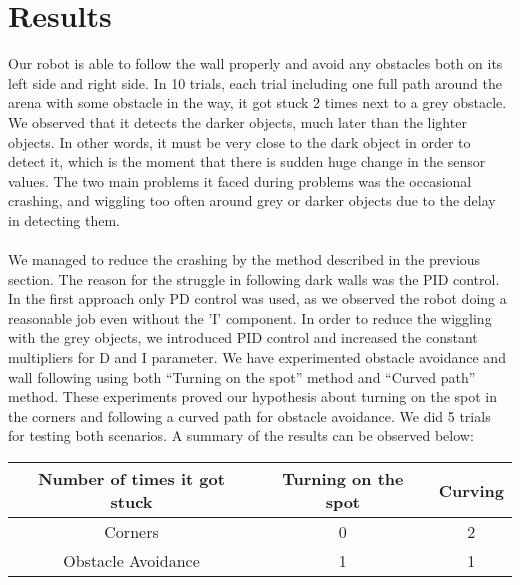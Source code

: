 \documentclass[]{article}
\begin{document}
\section{Results}
Our robot is able to follow the wall properly and avoid any obstacles both on its left side and right side. In 10 trials, each trial including one full path around the arena with some obstacle in the way, it got stuck 2 times next to a grey obstacle. We observed that it detects the darker objects, much later than the lighter objects. In other words, it must be very close to the dark object in order to detect it, which is the moment that there is sudden huge change in the sensor values. The two main problems it faced during problems was the occasional crashing, and wiggling too often around grey or darker objects due to the delay in detecting them.\\\\
We managed to reduce the crashing by the method described in the previous section. The reason for the struggle in following dark walls was the PID control. In the first approach only PD control was used, as we observed the robot doing a reasonable job even without the 'I' component. In order to reduce the wiggling with the grey objects, we introduced PID control and increased the constant multipliers for D and I parameter. We have experimented obstacle avoidance and wall following using both “Turning on the spot” method and “Curved path” method. These experiments proved our hypothesis about turning on the spot in the corners and following a curved path for obstacle avoidance. We did 5 trials for testing both scenarios. A summary of the results can be observed below:\\
\begin{center}
\begin{tabular}{ |c|c|c| }
 \hline
  Number of times it got stuck & Turning on the spot & Curving \\ 
 \hline
 Corners & 0 & 2 \\ 
 Obstacle Avoidance & 1 & 1 \\
 \hline
\end{tabular}
\end{center}
\end{document}
